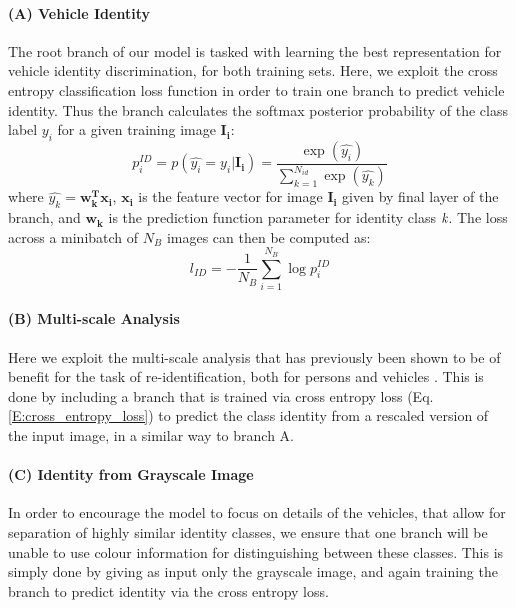 \documentclass[10pt,twocolumn,letterpaper]{article}
\begin{document}
\paragraph{(A) Vehicle Identity}

The root branch of our model is tasked with learning the best representation for vehicle identity discrimination, for both training sets. Here, we exploit the cross entropy classification loss function in order to train one branch to predict vehicle identity. Thus the branch calculates the softmax posterior probability of the class label $y_i$ for a given training image $\mathbf{I_i}$:
\begin{equation}
  p_i^{ID} = p(\hat{y_i} = y_i|\mathbf{I_i}) = \frac{\exp(\hat{y_i})}{\sum_{k=1}^{N_{id}}\exp(\hat{y_k})}
  \label{E:softmax_id}
\end{equation}
where $\hat{y_k} = \mathbf{w_k^Tx_i}$, $\mathbf{x_i}$ is the feature vector for image $\mathbf{I_i}$ given by final layer of the branch, and $\mathbf{w_k}$ is the prediction function parameter for identity class $\emph{k}$. The loss across a minibatch of $N_B$ images can then be computed as:
\begin{equation}
  l_{ID} = -\frac{1}{N_B} \sum_{i=1}^{N_B} \log{p_i^{ID}}
  \label{E:cross_entropy_loss}
\end{equation}

\paragraph{(B) Multi-scale Analysis}

Here we exploit the multi-scale analysis that has previously been shown to be of benefit for the task of re-identification, both for persons \cite{chen2017person} and vehicles \cite{kanaci2018vehicle}. This is done by including a branch that is trained via cross entropy loss (Eq. \ref{E:cross_entropy_loss}) to predict the class identity from a rescaled version of the input image, in a similar way to branch A.

\paragraph{(C) Identity from Grayscale Image}

In order to encourage the model to focus on details of the vehicles, that allow for separation of highly similar identity classes, we ensure that one branch will be unable to use colour information for distinguishing between these classes. This is simply done by giving as input only the grayscale image, and again training the branch to predict identity via the cross entropy loss.
\end{document}
